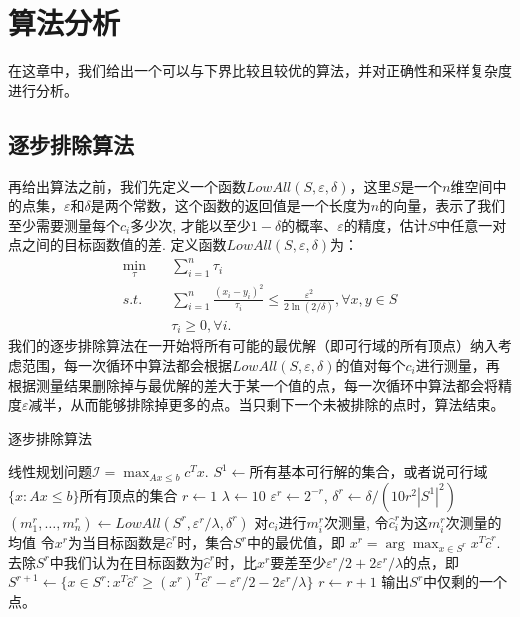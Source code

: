 
\chapter{算法分析}
\label{cha:algo}
在这章中，我们给出一个可以与下界比较且较优的算法，并对正确性和采样复杂度进行分析。
\section{逐步排除算法}
  再给出算法之前，我们先定义一个函数$LowAll(S, \varepsilon, \delta)$，这里$S$是一个$n$维空间中的点集，$\varepsilon$和$\delta$是两个常数，这个函数的返回值是一个长度为$n$的向量，表示了我们至少需要测量每个$c_i$多少次, 才能以至少$1-\delta$的概率、$\varepsilon$的精度，估计$S$中任意一对点之间的目标函数值的差. 定义函数$LowAll(S, \varepsilon, \delta)$为：
        \begin{align*}
        \min_{\tau} \quad & \sum_{i=1}^n \tau_i\\
        s.t.\quad & \sum_{i=1}^n \frac{(x_i -y_i)^2}{\tau_i} \le \frac{\varepsilon^2}{2 \ln(2/\delta)}, \forall x, y \in S\\
         &\tau_i\ge 0, \forall i.
        \end{align*}
我们的逐步排除算法在一开始将所有可能的最优解（即可行域的所有顶点）纳入考虑范围，每一次循环中算法都会根据$LowAll(S, \varepsilon, \delta)$的值对每个$c_i$进行测量，再根据测量结果删除掉与最优解的差大于某一个值的点，每一次循环中算法都会将精度$\varepsilon$减半，从而能够排除掉更多的点。当只剩下一个未被排除的点时，算法结束。
	\begin{algorithm}[H]                      %
                \caption{逐步排除算法}
                \label{Algo1}
                \begin{algorithmic}[1]
                	\REQUIRE 线性规划问题$\mathcal{I} = \max_{Ax\le b} c^T x$.
                    \STATE $S^1\gets$所有基本可行解的集合，或者说可行域$\{x: Ax\le b\}$所有顶点的集合
                    \STATE $r\gets 1$
                    \STATE $\lambda\gets 10$
                        \STATE $\varepsilon^r \gets 2^{-r}$, $\delta^r \gets \delta/(10 r^2 |S^1|^2)$
                        \STATE $(m^r_1, \dots, m^r_n) \gets LowAll(S^r, \varepsilon^r/\lambda, \delta^r)$
                        \STATE 对$c_i$进行$m^r_i$次测量, 令$\hat{c}^r_i$为这$m^r_i$次测量的均值
                        \STATE 令$x^r$为当目标函数是$\hat{c}^r$时，集合$S^r$中的最优值，即
                        $x^r = \arg \max_{x\in S^r} x^T \hat{c}^r$.
                        \STATE 去除$S^r$中我们认为在目标函数为$\hat{c}^r$时，比$x^r$要差至少$\varepsilon^r/2+2\varepsilon^r/\lambda$的点，即$S^{r+1} \gets \{ x\in S^r: x^T \hat{c}^r \ge (x^r)^T \hat{c}^r-\varepsilon^r/2-2\varepsilon^r/\lambda\}$
                        \STATE $r \gets r+1$
                    \ENDWHILE
                    \STATE 输出$S^r$中仅剩的一个点。
                \end{algorithmic}
                \end{algorithm}

